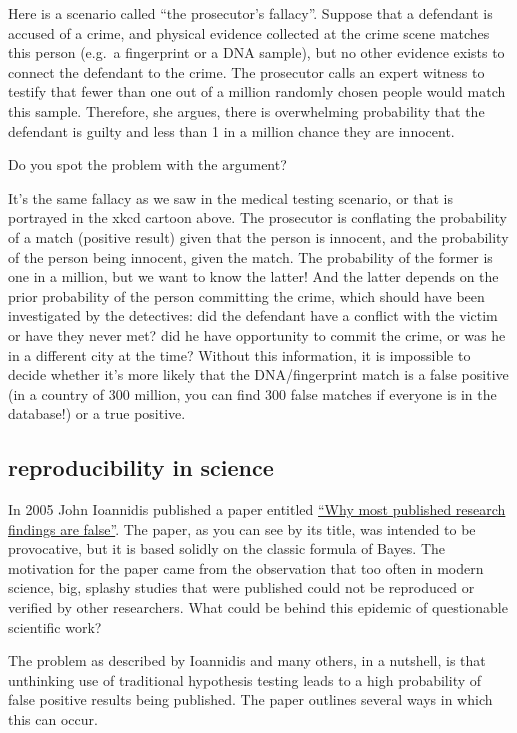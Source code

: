 \documentclass[
  letterpaper,
  DIV=11,
  numbers=noendperiod]{scrreprt}
\begin{document}
Here is a scenario called ``the prosecutor's fallacy''. Suppose that a
defendant is accused of a crime, and physical evidence collected at the
crime scene matches this person (e.g.~a fingerprint or a DNA sample),
but no other evidence exists to connect the defendant to the crime. The
prosecutor calls an expert witness to testify that fewer than one out of
a million randomly chosen people would match this sample. Therefore, she
argues, there is overwhelming probability that the defendant is guilty
and less than 1 in a million chance they are innocent.

Do you spot the problem with the argument?

It's the same fallacy as we saw in the medical testing scenario, or that
is portrayed in the xkcd cartoon above. The prosecutor is conflating the
probability of a match (positive result) given that the person is
innocent, and the probability of the person being innocent, given the
match. The probability of the former is one in a million, but we want to
know the latter! And the latter depends on the prior probability of the
person committing the crime, which should have been investigated by the
detectives: did the defendant have a conflict with the victim or have
they never met? did he have opportunity to commit the crime, or was he
in a different city at the time? Without this information, it is
impossible to decide whether it's more likely that the DNA/fingerprint
match is a false positive (in a country of 300 million, you can find 300
false matches if everyone is in the database!) or a true positive.

\subsection{reproducibility in
science}\label{reproducibility-in-science}

In 2005 John Ioannidis published a paper entitled
\href{https://journals.plos.org/plosmedicine/article?id=10.1371/journal.pmed.0020124}{``Why
most published research findings are false''}. The paper, as you can see
by its title, was intended to be provocative, but it is based solidly on
the classic formula of Bayes. The motivation for the paper came from the
observation that too often in modern science, big, splashy studies that
were published could not be reproduced or verified by other researchers.
What could be behind this epidemic of questionable scientific work?

The problem as described by Ioannidis and many others, in a nutshell, is
that unthinking use of traditional hypothesis testing leads to a high
probability of false positive results being published. The paper
outlines several ways in which this can occur.
\end{document}
